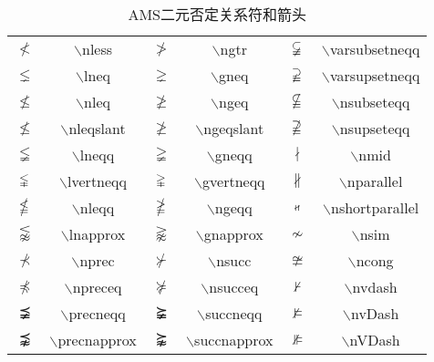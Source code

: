 \documentclass[UTF8]{ctexart}
\begin{document}
\begin{table}[H]
	\begin{center}
		\caption{AMS二元否定关系符和箭头}
		\begin{tabular}{cccccc}
			
			$\nless$  &  $\backslash$nless  &  $\ngtr$  & $\backslash$ngtr  &  $\varsubsetneqq$  & $\backslash$varsubsetneqq  \\

			$\lneq$  &  $\backslash$lneq  &  $\gneq$  & $\backslash$gneq  &  $\varsupsetneqq$  & $\backslash$varsupsetneqq  \\

			$\nleq$  &  $\backslash$nleq  &  $\ngeq$  & $\backslash$ngeq  &  $\nsubseteqq$  & $\backslash$nsubseteqq  \\

			$\nleqslant$  &  $\backslash$nleqslant  &  $\ngeqslant$  & $\backslash$ngeqslant  &  $\nsupseteqq$  & $\backslash$nsupseteqq  \\

			$\lneqq$  &  $\backslash$lneqq  &  $\gneqq$  & $\backslash$gneqq  &  $\nmid$  & $\backslash$nmid  \\

			$\lvertneqq$  &  $\backslash$lvertneqq  &  $\gvertneqq$  & $\backslash$gvertneqq  &  $\nparallel$  & $\backslash$nparallel  \\

			$\nleqq$  &  $\backslash$nleqq  &  $\ngeqq$  & $\backslash$ngeqq  &  $\nshortparallel$  & $\backslash$nshortparallel  \\

			$\lnapprox$  &  $\backslash$lnapprox  &  $\gnapprox$  & $\backslash$gnapprox  &  $\nsim$  & $\backslash$nsim  \\

			$\nprec$  &  $\backslash$nprec  &  $\nsucc$  & $\backslash$nsucc  &  $\ncong$   &  $\backslash$ncong  \\

			$\npreceq$  &  $\backslash$npreceq  &  $\nsucceq$  & $\backslash$nsucceq  &  $\nvdash$   &  $\backslash$nvdash  \\			
			
			$\precneqq$  &  $\backslash$precneqq  &  $\succneqq$  & $\backslash$succneqq  &  $\nvDash$  & $\backslash$nvDash  \\

			$\precnapprox$  &  $\backslash$precnapprox  &  $\succnapprox$  & $\backslash$succnapprox  &  $\nVDash$  & $\backslash$nVDash  \\


\end{tabular}
\end{center}
\end{table}
\end{document}
